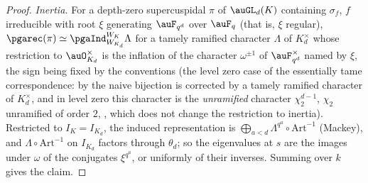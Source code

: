 \documentclass[10pt]{amsart}
\theoremstyle{definition}
\theoremstyle{remark}
\begin{document}
\begin{proof}
\emph{Inertia.} For a depth-zero supercuspidal $\pi$ of $\auGL_d(K)$ containing $\sigma_f$, $f$
irreducible with root $\xi$ generating $\auF_{q^d}$ over $\auF_q$ (that is, $\xi$ regular),
$\pgarec(\pi)\simeq\pgaInd_{W_{K_d}}^{W_K}\Lambda$ for a tamely ramified character $\Lambda$ of
$K_d^\times$ whose restriction to $\auO_{K_d}^\times$ is the inflation of the character
$\omega^{\pm1}$ of $\auF_{q^d}^\times$ named by $\xi$, the sign being fixed by the conventions
(the level zero case of the essentially tame correspondence: by
\cite[Corollary~3.3]{BHtame} the naive bijection is corrected by a tamely ramified character of
$K_d^\times$, and in level zero this character is the \emph{unramified} character
$\chi_2^{d-1}$, $\chi_2$ unramified of order $2$, \cite[\S7.5, (7.5.1)]{BHeffective}, which
does not change the restriction to inertia). Restricted to
$I_K=I_{K_d}$, the induced representation is $\bigoplus_{a<d}\Lambda^{q^a}\circ\mathrm{Art}^{-1}$
(Mackey), and $\Lambda\circ\mathrm{Art}^{-1}$ on $I_{K_d}$ factors through $\theta_d$; so the
eigenvalues at $s$ are the images under $\omega$ of the conjugates $\xi^{q^a}$, or uniformly of their
inverses. Summing over $k$ gives the
claim.
\end{proof}
\end{document}
